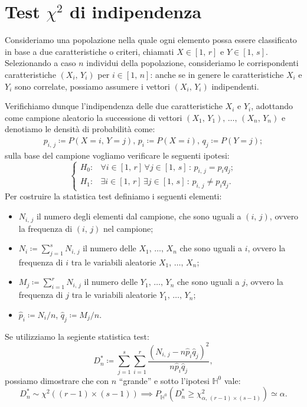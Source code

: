     \section{Test $\chi^2$ di indipendenza}
        \begin{defn}
            Consideriamo una popolazione nella quale ogni elemento possa essere classificato in base a due caratteristiche 
            o criteri, chiamati $X \in [1,\,r]$ e $Y \in [1,\,s]$. Selezionando a caso $n$ individui della popolazione, 
            consideriamo le corrispondenti caratteristiche $(X_i,\,Y_i)$ per $i\in [1,\,n]$: anche se in genere le 
            caratteristiche $X_i$ e $Y_i$ sono correlate, possiamo assumere i vettori $(X_i,\,Y_i)$ indipendenti.

            Verifichiamo dunque l'indipendenza delle due caratteristiche $X_i$ e $Y_i$, adottando come campione aleatorio 
            la successione di vettori $(X_1,\,Y_1),\, \ldots,\, (X_n,\,Y_n)$ e denotiamo le densità di probabilità come:
            \begin{align*}
                p_{i,\,j} \coloneqq P(X=i,\,Y=j),\, p_i\coloneqq P(X=i),\, q_j\coloneqq P(Y=j)
            ;\end{align*}
            sulla base del campione vogliamo verificare le seguenti ipotesi: \[
                \begin{cases}
                    H_0 : & \forall i \in [1,\,r] \,\forall j \in [1,\,s] \,:\, p_{i,\,j} = p_iq_j; \\
                    H_1 : & \exists i \in [1,\,r] \,\exists j \in [1,\,s] \,:\, p_{i,\,j} \neq p_iq_j.
                \end{cases}
            \] Per costruire la statistica test definiamo i seguenti elementi:
            \begin{itemize}
                \item $N_{i,\,j}$ il numero degli elementi dal campione, che sono uguali a $(i,\,j)$, ovvero la frequenza 
                    di $(i,\,j)$ nel campione;
                \item $N_i \coloneqq \sum_{j=1}^{s} N_{i,\,j}$ il numero delle $X_1,\, \ldots,\, X_{n}$ che sono 
                    uguali a $i$, ovvero la frequenza di $i$ tra le variabili aleatorie $X_1,\, \ldots,\, X_{n}$;
                \item $M_j \coloneqq \sum_{i=1}^{r} N_{i,\,j}$ il numero delle $Y_1,\, \ldots,\, Y_{n}$ che sono 
                    uguali a $j$, ovvero la frequenza di $j$ tra le variabili aleatorie $Y_1,\, \ldots,\, Y_{n}$;
                \item $\hat{p}_i \coloneqq N_i \slash n$, $\hat{q}_j \coloneqq M_j \slash n$.
            \end{itemize}
            Se utilizziamo la segiente statistica test: \[
                D_n^* \coloneqq \sum_{j=1}^{s} \sum_{i=1}^{r} \frac{(N_{i,\,j} - n \hat{p}_i\hat{q}_j)^2}{n\hat{p}_i\hat{q}_j}
            ,\] possiamo dimostrare che con $n$ ``grande'' e sotto l'ipotesi $\mathbb{H}^0$ vale: \[
            D_n^* \sim \chi^2\left((r-1) \times (s-1)\right) \implies P_{\mathbb{H}^0}\left(D_n^* 
                \geq \chi^2_{\alpha,\, (r-1) \times (s-1)}\right) \simeq \alpha
            .\] 
        \end{defn}

